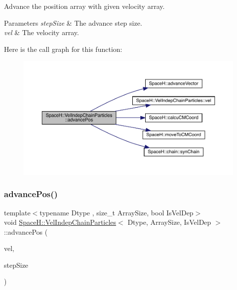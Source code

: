 Advance the position array with given velocity array. 


\begin{DoxyParams}{Parameters}
{\em step\+Size} & The advance step size. \\
\hline
{\em vel} & The velocity array. \\
\hline
\end{DoxyParams}
Here is the call graph for this function\+:
\nopagebreak
\begin{figure}[H]
\begin{center}
\leavevmode
\includegraphics[width=350pt]{class_space_h_1_1_vel_indep_chain_particles_ae71e70b6374f8326b5ffb62d06284942_cgraph}
\end{center}
\end{figure}
\mbox{\label{class_space_h_1_1_vel_indep_chain_particles_ae71e70b6374f8326b5ffb62d06284942}} 
\subsubsection{\texorpdfstring{advance\+Pos()}{advancePos()}\hspace{0.1cm}{\footnotesize\ttfamily [4/4]}}
{\footnotesize\ttfamily template$<$typename Dtype , size\+\_\+t Array\+Size, bool Is\+Vel\+Dep$>$ \\
void \mbox{\hyperlink{class_space_h_1_1_vel_indep_chain_particles}{Space\+H\+::\+Vel\+Indep\+Chain\+Particles}}$<$ Dtype, Array\+Size, Is\+Vel\+Dep $>$\+::advance\+Pos (\begin{DoxyParamCaption}\item[{const \mbox{\hyperlink{class_space_h_1_1_vel_indep_particles_aa9983058940249df8b00fa800e8cbad2}{Vector\+Array}} \&}]{vel,  }\item[{\mbox{\hyperlink{class_space_h_1_1_vel_indep_particles_aeb47d8131b30ed790320ff634f0d6af1}{Scalar}}}]{step\+Size }\end{DoxyParamCaption})\hspace{0.3cm}{\ttfamily [inline]}}



